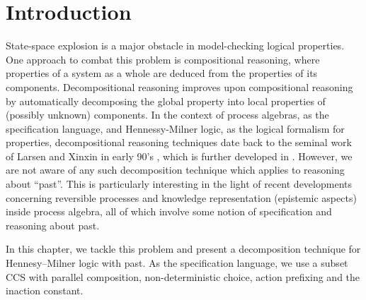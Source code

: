 \section{Introduction}
State-space explosion is a major obstacle in model-checking logical properties.
One approach to combat this problem is compositional reasoning,
where properties of a system as a whole are deduced from the properties of its components.
Decompositional reasoning \cite{Giannakopoulou05,Xie05} improves upon compositional reasoning by
automatically decomposing the global property into local properties of (possibly unknown) components.
In the context of process algebras, as the specification language, and Hennessy-Milner logic, as the logical formalism for properties,
decompositional reasoning techniques date back to the seminal work of Larsen and Xinxin in early 90's \cite{Larsen91},
which is further developed in \cite{Simpson04,Fokkink06}.
However, we are not aware of any such decomposition technique which applies to reasoning about ``past''.
This is particularly interesting in the light of recent developments concerning reversible processes and
knowledge representation (epistemic aspects) inside process algebra,
all of which involve some notion of specification and reasoning about past.


In this chapter, we tackle this problem and present a decomposition technique for Hennesy--Milner logic with past.
As the specification language, we use a subset CCS with parallel composition, non-deterministic choice, action prefixing
and the inaction constant.


